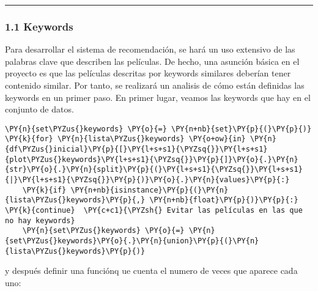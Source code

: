     \begin{center}\rule{0.5\linewidth}{0.5pt}\end{center}

\hypertarget{keywords}{%
\subsubsection{1.1 Keywords}\label{keywords}}

    Para desarrollar el sistema de recomendación, se hará un uso extensivo
de las palabras clave que describen las películas. De hecho, una
asunción básica en el proyecto es que las películas descritas por
keywords similares deberían tener contenido similar. Por tanto, se
realizará un analisis de cómo están definidas las keywords en un primer
paso. En primer lugar, veamos las keywords que hay en el conjunto de
datos.

    \begin{tcolorbox}[breakable, size=fbox, boxrule=1pt, pad at break*=1mm,colback=cellbackground, colframe=cellborder]
\begin{Verbatim}[commandchars=\\\{\}]
\PY{n}{set\PYZus{}keywords} \PY{o}{=} \PY{n+nb}{set}\PY{p}{(}\PY{p}{)}
\PY{k}{for} \PY{n}{lista\PYZus{}keywords} \PY{o+ow}{in} \PY{n}{df\PYZus{}inicial}\PY{p}{[}\PY{l+s+s1}{\PYZsq{}}\PY{l+s+s1}{plot\PYZus{}keywords}\PY{l+s+s1}{\PYZsq{}}\PY{p}{]}\PY{o}{.}\PY{n}{str}\PY{o}{.}\PY{n}{split}\PY{p}{(}\PY{l+s+s1}{\PYZsq{}}\PY{l+s+s1}{|}\PY{l+s+s1}{\PYZsq{}}\PY{p}{)}\PY{o}{.}\PY{n}{values}\PY{p}{:}
    \PY{k}{if} \PY{n+nb}{isinstance}\PY{p}{(}\PY{n}{lista\PYZus{}keywords}\PY{p}{,} \PY{n+nb}{float}\PY{p}{)}\PY{p}{:} \PY{k}{continue}  \PY{c+c1}{\PYZsh{} Evitar las películas en las que no hay keywords}
    \PY{n}{set\PYZus{}keywords} \PY{o}{=} \PY{n}{set\PYZus{}keywords}\PY{o}{.}\PY{n}{union}\PY{p}{(}\PY{n}{lista\PYZus{}keywords}\PY{p}{)}
\end{Verbatim}
\end{tcolorbox}

    y después definir una funciónq ue cuenta el numero de veces que aparece
cada uno:

